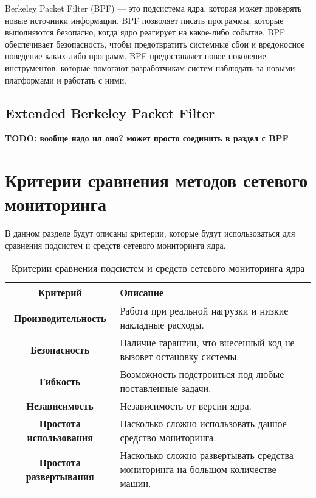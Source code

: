 Berkeley Packet Filter (BPF) — это подсистема ядра, которая может проверять новые источники информации.
BPF позволяет писать программы, которые выполняются безопасно, когда ядро реагирует на какое-либо событие.
BPF обеспечивает безопасность, чтобы предотвратить системные сбои и вредоносное поведение каких-либо программ.
BPF предоставляет новое поколение инструментов, которые помогают разработчикам систем
наблюдать за новыми платформами и работать с ними.


\subsection{Extended Berkeley Packet Filter}

\textbf{TODO: вообще надо ил оно? может просто соединить в раздел с BPF}

\clearpage

\section{Критерии сравнения методов сетевого мониторинга}

В данном разделе будут описаны критерии, которые будут использоваться для сравнения подсистем и средств сетевого мониторинга ядра.

\begin{table}[h!]
	\begin{center}
		\begin{threeparttable}
			\caption{\label{tb:criteria}Критерии сравнения подсистем и средств сетевого мониторинга ядра}
			\begin{tabular}{|c|p{8cm}|}
				\hline
				\textbf{Критерий} & \textbf{Описание} \\ \hline
				\textbf{Производительность} & Работа при реальной нагрузки и низкие накладные расходы. \\ \hline
				\textbf{Безопасность} & Наличие гарантии, что внесенный код не вызовет остановку системы. \\ \hline
				\textbf{Гибкость} & Возможность подстроиться под любые поставленные задачи. \\ \hline
				\textbf{Независимость} & Независимость от версии ядра. \\ \hline
				\textbf{Простота использования} & Насколько сложно использовать данное средство мониторинга. \\ \hline
				\textbf{Простота развертывания} & Насколько сложно развертывать средства мониторинга на большом количестве машин. \\ \hline
			\end{tabular}
		\end{threeparttable}
	\end{center}
\end{table}


